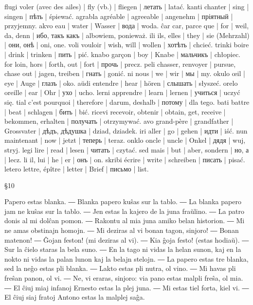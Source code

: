 flugi voler (avec des ailes) | fly (vb.) | fliegen | летать | latać.
kanti chanter | sing | singen | пѣть | śpiewać.
agrabla agréable | agreeable | angenehm | пріятный | przyjemny.
akvo eau | water | Wasser | вода | woda.
ĉar car, parce que | for | weil, da, denn | ибо, такъ какъ | albowiem, ponieważ.
ili ils, elles | they | sie (Mehrzahl) | они, онѣ | oni, one.
voli vouloir | wish, will | wollen | хотѣть | chcieć.
trinki boire | drink | trinken | пить | pić.
knabo garçon | boy | Knabe | мальчикъ | chłopiec.
for loin, hors | forth, out | fort | прочь | precz.
peli chasser, renvoyer | pursue, chase out | jagen, treiben | гнать | gonić.
ni nous | we | wir | мы | my.
okulo œil | eye | Auge | глазъ | oko.
aŭdi entendre | hear | hören | слышать | słyszeć.
orelo oreille | ear | Ohr | ухо | ucho.
lerni apprendre | learn | lernen | учиться | uczyć się.
tial c’est pourquoi | therefore | darum, deshalb | потому | dla tego.
bati battre | beat | schlagen | бить | bić.
ricevi recevoir, obtenir | obtain, get, receive | bekommen, erhalten | получать | otrzymywać.
avo grand-père | grandfather | Grossvater | дѣдъ, дѣдушка | dziad, dziadek.
iri aller | go | gehen | идти | iść.
nun maintenant | now | jetzt | теперь | teraz.
onklo oncle | uncle | Onkel | дядя | wuj, stryj.
legi lire | read | lesen | читать | czytać.
sed mais | but | aber, sondern | но, а | lecz.
li il, lui | he | er | онъ | on.
skribi écrire | write | schreiben | писать | pisać.
letero lettre, épître | letter | Brief | письмо | list.

§10

Papero estas blanka. ― Blanka papero kuŝas sur la tablo. ― La blanka papero jam ne kuŝas sur la tablo. ― Jen estas la kajero de la juna fraŭlino. ― La patro donis al mi dolĉan pomon. ― Rakontu al mia juna amiko belan historion. ― Mi ne amas obstinajn homojn. ― Mi deziras al vi bonan tagon, sinjoro! ― Bonan matenon! ― Ĝojan feston! (mi deziras al vi). ― Kia ĝoja festo! (estas hodiaŭ). ― Sur la ĉielo staras la bela suno. ― En la tago ni vidas la helan sunon, kaj en la nokto ni vidas la palan lunon kaj la belajn stelojn. ― La papero estas tre blanka, sed la neĝo estas pli blanka. ― Lakto estas pli nutra, ol vino. ― Mi havas pli freŝan panon, ol vi. ― Ne, vi eraras, sinjoro: via pano estas malpli freŝa, ol mia. ― El ĉiuj miaj infanoj Ernesto estas la plej juna. ― Mi estas tiel forta, kiel vi. ― El ĉiuj siaj fratoj Antono estas la malplej saĝa.

